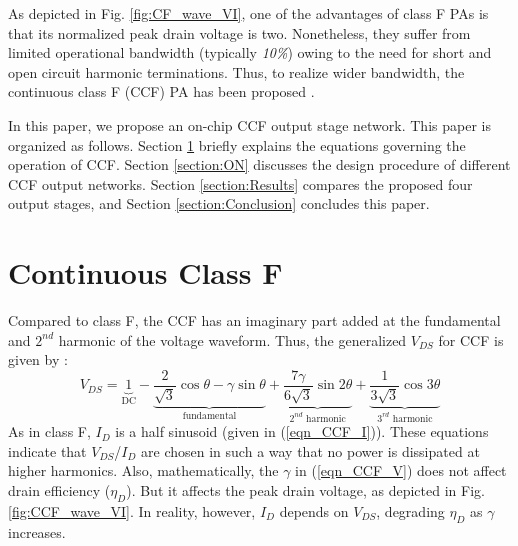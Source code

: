 \documentclass[conference]{IEEEtran}
\begin{document}
\color{blue} As depicted in Fig. \ref{fig:CF_wave_VI},  one of the advantages of class F PAs is that its normalized peak drain voltage is two. Nonetheless, they suffer from limited operational bandwidth \color{black}  (typically \textit{10\%}) owing to the need for short and open circuit harmonic terminations. Thus, to realize wider bandwidth, the \color{blue} continuous class F (CCF) \color{black} PA has been proposed \cite{CCF_reason}.

\color{blue} In this paper, we propose an on-chip CCF output stage network. This paper is organized as follows. Section \ref{section:CCF} briefly explains the equations governing the operation of CCF. Section \ref{section:ON} discusses the design procedure of different CCF output networks. Section \ref{section:Results} compares the proposed four output stages, and Section \ref{section:Conclusion} concludes this paper. \color{black}

\section{Continuous Class F}
\label{section:CCF}
\vspace{-0.05in}
Compared to class F, the CCF has an imaginary part added at the fundamental and $2^{nd}$ harmonic of \color{blue} the \color{black} voltage waveform. \color{blue} Thus, \color{black} the generalized $V_{DS}$ for CCF is given by \cite{ECCF_Carrubba}:
\begin{equation}
V_{DS}=\underbrace{1}_{\text{DC}}-\underbrace{\frac{2}{\sqrt{3}} \cos \theta-\gamma \sin \theta}_{\text{fundamental}}+\underbrace{\frac{7 \gamma}{6 \sqrt{3}} \sin 2 \theta}_{\text{$2^{nd}$ harmonic}}+\underbrace{\frac{1}{3 \sqrt{3}} \cos 3 \theta}_{\text{$3^{rd}$ harmonic}}
\label{eqn_CCF_V}
\end{equation}
\color{blue} As in class F, \color{black} $I_{D}$ is a half sinusoid \color{blue} (given in (\ref{eqn_CCF_I})). These equations indicate that $V_{DS}$/$I_{D}$ \color{black}  are chosen in such a way that no power is dissipated at higher harmonics. Also, \color{blue} mathematically, \color{black} the $\gamma$ in \color{blue}(\ref{eqn_CCF_V}) does not \color{black}  affect drain efficiency ($\eta_D$). But \color{blue} it affects the peak drain voltage, as depicted in Fig. \ref{fig:CCF_wave_VI}. In reality, however, $I_{D}$ depends on $V_{DS}$, degrading $\eta_D$ as $\gamma$ increases.\color{black} 
\end{document}

